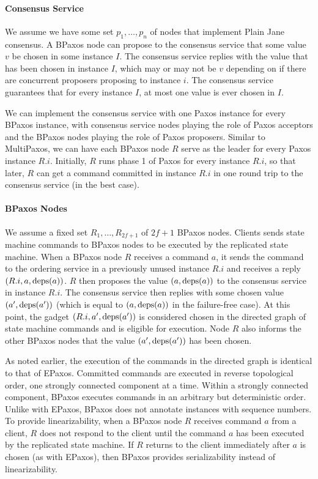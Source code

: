 \paragraph{Consensus Service}
We assume we have some set $p_1, \ldots, p_n$ of nodes that implement Plain
Jane consensus. A BPaxos node can propose to the consensus service that some
value $v$ be chosen in some instance $I$. The consensus service replies with
the value that has been chosen in instance $I$, which may or may not be $v$
depending on if there are concurrent proposers proposing to instance $i$. The
consensus service guarantees that for every instance $I$, at most one value is
ever chosen in $I$.

We can implement the consensus service with one Paxos instance for every BPaxos
instance, with consensus service nodes playing the role of Paxos acceptors and
the BPaxos nodes playing the role of Paxos proposers. Similar to MultiPaxos, we
can have each BPaxos node $R$ serve as the leader for every Paxos instance
$R.i$. Initially, $R$ runs phase 1 of Paxos for every instance $R.i$, so that
later, $R$ can get a command committed in instance $R.i$ in one round trip to
the consensus service (in the best case).

\paragraph{BPaxos Nodes}
We assume a fixed set $R_1, \ldots, R_{2f+1}$ of $2f + 1$ BPaxos nodes.
%
Clients sends state machine commands to BPaxos nodes to be executed by the
replicated state machine. When a BPaxos node $R$ receives a command $a$, it
sends the command to the ordering service in a previously unused instance $R.i$
and receives a reply $(R.i, a, \text{deps}(a))$. $R$ then proposes the value $(a,
\text{deps}(a))$ to the consensus service in instance $R.i$. The consensus service
then replies with some chosen value $(a', \text{deps}(a'))$ (which is equal to $(a,
\text{deps}(a))$ in the failure-free case). At this point, the gadget $(R.i, a',
\text{deps}(a'))$ is considered chosen in the directed graph of state machine
commands and is eligible for execution. Node $R$ also informs the other BPaxos
nodes that the value $(a', \text{deps}(a'))$ has been chosen.

As noted earlier, the execution of the commands in the directed graph is
identical to that of EPaxos. Committed commands are executed in reverse
topological order, one strongly connected component at a time. Within a
strongly connected component, BPaxos executes commands in an arbitrary but
deterministic order. Unlike with EPaxos, BPaxos does not annotate instances
with sequence numbers. To provide linearizability, when a BPaxos node $R$
receives command $a$ from a client, $R$ does not respond to the client until
the command $a$ has been executed by the replicated state machine. If $R$
returns to the client immediately after $a$ is chosen (as with EPaxos), then
BPaxos provides serializability instead of linearizability.

